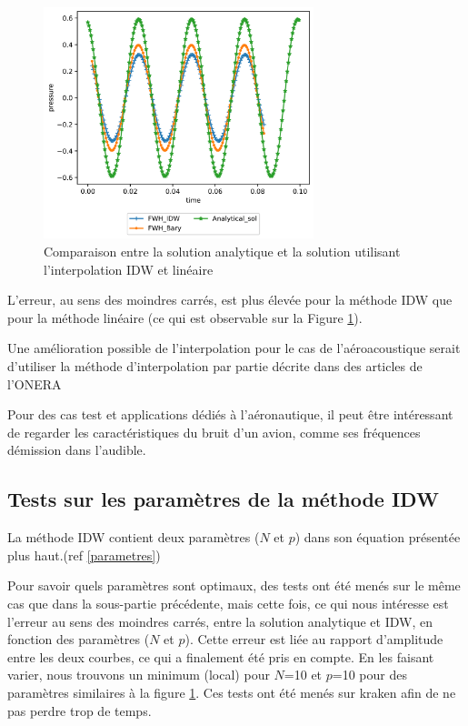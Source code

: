 \begin{figure}[H]
    \centering
    \includegraphics[width=0.70\textwidth]{images/onde_aac.png}
    \caption{Comparaison entre la solution analytique et la solution utilisant l'interpolation IDW et linéaire}
    \label{fig:onde_aac}
\end{figure}

L'erreur, au sens des moindres carrés, est plus élevée pour la méthode IDW que pour la méthode linéaire (ce qui est observable sur la Figure \ref{fig:onde_aac}).


Une amélioration possible de l'interpolation pour le cas de l'aéroacoustique serait d'utiliser la méthode d'interpolation par partie décrite dans des articles de l’ONERA \cite{cunha2011} \cite{cunha2016}

Pour des cas test et applications dédiés à l'aéronautique, il peut être intéressant de regarder les caractéristiques du bruit d'un avion, comme ses fréquences démission dans l'audible. \cite{frequence}

\subsection{Tests sur les paramètres de la méthode IDW}

La méthode IDW contient deux paramètres (\(N\) et \(p\)) dans son équation présentée plus haut.(ref \ref{parametres})

Pour savoir quels paramètres sont optimaux, des tests ont été menés sur le même cas que dans la sous-partie précédente, mais cette fois, ce qui nous intéresse est l'erreur au sens des moindres carrés, entre la solution analytique et IDW, en fonction des paramètres (\(N\) et \(p\)). Cette erreur est liée au rapport d'amplitude entre les deux courbes, ce qui a finalement été pris en compte. En les faisant varier, nous trouvons un minimum (local) pour \(N\)=10 et \(p\)=10 pour des paramètres similaires à la figure \ref{fig:onde_aac}.
Ces tests ont été menés sur kraken afin de ne pas perdre trop de temps.

